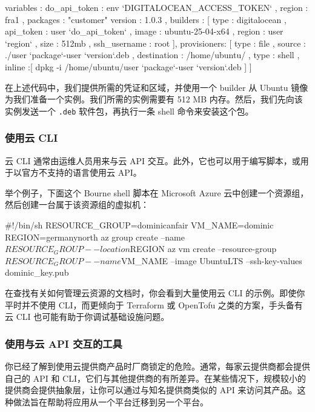 \begin{codebox}[text]
{
   variables : {
     do_api_token : {{env `DIGITALOCEAN_ACCESS_TOKEN`}} ,
     region : fra1 ,
     packages : "customer"
     version : 1.0.3
  },
  builders : [
    {
       type : digitalocean ,
       api_token : {{user `do_api_token`}} ,
       image : ubuntu-25-04-x64 ,
       region : {{user `region`}} ,
       size : 512mb ,
       ssh_username : root
    }
  ],
  provisioners: [
    {
       type : file ,
       source : ./{{user `package`}}-{{user `version`}}.deb ,
       destination : /home/ubuntu/
    },
    {
       type : shell ,
       inline :[
         dpkg -i /home/ubuntu/{{user `package`}}-{{user `version`}}.deb
      ]
    }
  ]
}
\end{codebox}

\label{idx:1476}
在上述代码中，我们提供所需的凭证和区域，并使用一个 builder 从 Ubuntu 镜像为我们准备一个实例。我们所需的实例需要有 512 MB 内存。然后，我们先向该实例发送一个 \texttt{.deb} 软件包，再执行一条 shell 命令来安装这个包。

\subsubsection{使用云 CLI}

\label{idx:1477}
云 CLI 通常由运维人员用来与云 API 交互。此外，它也可以用于编写脚本，或用于以官方不支持的语言使用云 API。

举个例子，下面这个 Bourne shell 脚本在 Microsoft Azure 云中创建一个资源组，然后创建一台属于该资源组的虚拟机：

\begin{codebox}[text]
#!/bin/sh
RESOURCE_GROUP=dominicanfair
VM_NAME=dominic
REGION=germanynorth
az group create --name $RESOURCE_GROUP --location $REGION
az vm create --resource-group $RESOURCE_GROUP --name $VM_NAME --image UbuntuLTS --ssh-key-values dominic_key.pub
\end{codebox}

\label{idx:1478}
在查找有关如何管理云资源的文档时，你会看到大量使用云 CLI 的示例。即使你平时并不使用 CLI，而更倾向于 Terraform 或 OpenTofu 之类的方案，手头备有云 CLI 也可能有助于你调试基础设施问题。

\subsubsection{使用与云 API 交互的工具}

\label{idx:1479}
你已经了解到使用云提供商产品时厂商锁定的危险。通常，每家云提供商都会提供自己的 API 和 CLI，它们与其他提供商的有所差异。在某些情况下，规模较小的提供商会提供抽象层，让你可以通过与知名提供商类似的 API 来访问其产品。这种做法旨在帮助将应用从一个平台迁移到另一个平台。

